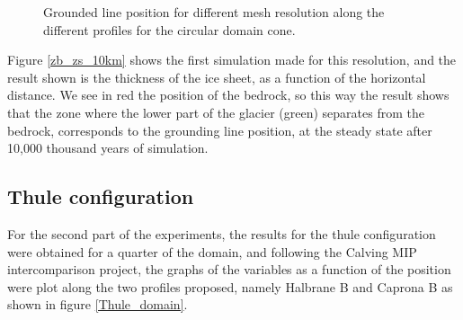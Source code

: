 \documentclass{article}
\begin{document}
\begin{figure}[!h]
	\caption{Grounded line position for different mesh resolution along the different profiles for the circular domain cone.}
	\label{Grounded_line_CONE}
\end{figure}

Figure \ref{zb_zs_10km} shows the first simulation made for this resolution, and the result shown is the thickness of the ice sheet, as a function of the horizontal distance. We see in red the position of the bedrock, so this way the result shows that the zone where the lower part of the glacier (green) separates from the bedrock, corresponds to the grounding line position, at the steady state after 10,000 thousand years of simulation.  
 
\subsection{Thule configuration}
For the second part of the experiments, the results for the thule configuration were obtained for a quarter of the domain, and following the Calving MIP intercomparison project, the graphs of the variables as a function of the position were plot along the two profiles proposed, namely Halbrane B and Caprona B as shown in figure \ref{Thule_domain}.
\end{document}
